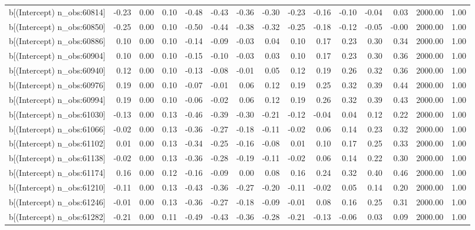\begin{table}[ht]
\begin{tabular}{rrrrrrrrrrrrrrr}
  b[(Intercept) n\_obs:60814] & -0.23 & 0.00 & 0.10 & -0.48 & -0.43 & -0.36 & -0.30 & -0.23 & -0.16 & -0.10 & -0.04 & 0.03 & 2000.00 & 1.00 \\ 
  b[(Intercept) n\_obs:60850] & -0.25 & 0.00 & 0.10 & -0.50 & -0.44 & -0.38 & -0.32 & -0.25 & -0.18 & -0.12 & -0.05 & -0.00 & 2000.00 & 1.00 \\ 
  b[(Intercept) n\_obs:60886] & 0.10 & 0.00 & 0.10 & -0.14 & -0.09 & -0.03 & 0.04 & 0.10 & 0.17 & 0.23 & 0.30 & 0.34 & 2000.00 & 1.00 \\ 
  b[(Intercept) n\_obs:60904] & 0.10 & 0.00 & 0.10 & -0.15 & -0.10 & -0.03 & 0.03 & 0.10 & 0.17 & 0.23 & 0.30 & 0.36 & 2000.00 & 1.00 \\ 
  b[(Intercept) n\_obs:60940] & 0.12 & 0.00 & 0.10 & -0.13 & -0.08 & -0.01 & 0.05 & 0.12 & 0.19 & 0.26 & 0.32 & 0.36 & 2000.00 & 1.00 \\ 
  b[(Intercept) n\_obs:60976] & 0.19 & 0.00 & 0.10 & -0.07 & -0.01 & 0.06 & 0.12 & 0.19 & 0.25 & 0.32 & 0.39 & 0.44 & 2000.00 & 1.00 \\ 
  b[(Intercept) n\_obs:60994] & 0.19 & 0.00 & 0.10 & -0.06 & -0.02 & 0.06 & 0.12 & 0.19 & 0.26 & 0.32 & 0.39 & 0.43 & 2000.00 & 1.00 \\ 
  b[(Intercept) n\_obs:61030] & -0.13 & 0.00 & 0.13 & -0.46 & -0.39 & -0.30 & -0.21 & -0.12 & -0.04 & 0.04 & 0.12 & 0.22 & 2000.00 & 1.00 \\ 
  b[(Intercept) n\_obs:61066] & -0.02 & 0.00 & 0.13 & -0.36 & -0.27 & -0.18 & -0.11 & -0.02 & 0.06 & 0.14 & 0.23 & 0.32 & 2000.00 & 1.00 \\ 
  b[(Intercept) n\_obs:61102] & 0.01 & 0.00 & 0.13 & -0.34 & -0.25 & -0.16 & -0.08 & 0.01 & 0.10 & 0.17 & 0.25 & 0.33 & 2000.00 & 1.00 \\ 
  b[(Intercept) n\_obs:61138] & -0.02 & 0.00 & 0.13 & -0.36 & -0.28 & -0.19 & -0.11 & -0.02 & 0.06 & 0.14 & 0.22 & 0.30 & 2000.00 & 1.00 \\ 
  b[(Intercept) n\_obs:61174] & 0.16 & 0.00 & 0.12 & -0.16 & -0.09 & 0.00 & 0.08 & 0.16 & 0.24 & 0.32 & 0.40 & 0.46 & 2000.00 & 1.00 \\ 
  b[(Intercept) n\_obs:61210] & -0.11 & 0.00 & 0.13 & -0.43 & -0.36 & -0.27 & -0.20 & -0.11 & -0.02 & 0.05 & 0.14 & 0.20 & 2000.00 & 1.00 \\ 
  b[(Intercept) n\_obs:61246] & -0.01 & 0.00 & 0.13 & -0.36 & -0.27 & -0.18 & -0.09 & -0.01 & 0.08 & 0.16 & 0.25 & 0.31 & 2000.00 & 1.00 \\ 
  b[(Intercept) n\_obs:61282] & -0.21 & 0.00 & 0.11 & -0.49 & -0.43 & -0.36 & -0.28 & -0.21 & -0.13 & -0.06 & 0.03 & 0.09 & 2000.00 & 1.00 \\ 

\end{tabular}
\end{table}
